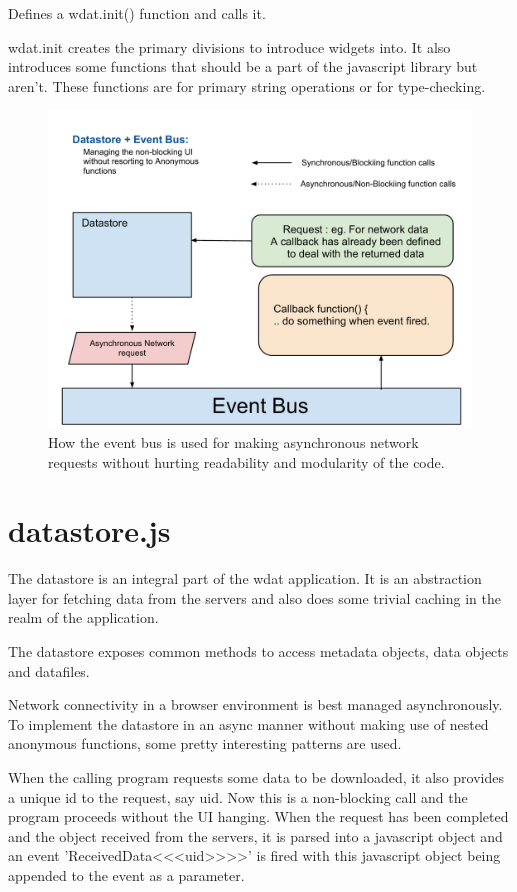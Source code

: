 Defines a wdat.init() function and calls it.

wdat.init creates the primary divisions to introduce widgets into. It
also introduces some functions that should be a part of the javascript
library but aren't.  These functions are for primary string operations
or for type-checking.

\begin{figure}[h!t]
  \centering
  \includegraphics[width=\textwidth]{src/images/DatastoreAndEventBus.pdf}
  \caption{How the event bus is used for making asynchronous network requests without hurting readability and modularity of the code.}
\end{figure}

\section{datastore.js}

The datastore is an integral part of the wdat application.  It is an
abstraction layer for fetching data from the servers and also does
some trivial caching in the realm of the application.  

The datastore exposes common methods to access metadata objects, data
objects and datafiles.  

Network connectivity in a browser environment is best managed
asynchronously.  To implement the datastore in an async manner without
making use of nested anonymous functions, some pretty interesting
patterns are used.

When the calling program requests some data to be downloaded, it also
provides a unique id to the request, say uid.  Now this is a
non-blocking call and the program proceeds without the UI hanging.
When the request has been completed and the object received from the
servers, it is parsed into a javascript object and an event
'ReceivedData\textunderscore\textless\textless<uid>>\textgreater\textgreater'
is fired with this javascript object being appended to the event as a
parameter.

